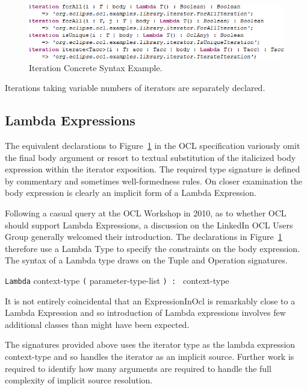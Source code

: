 \documentclass{eceasst}
\begin{document}
\begin{figure}
  \begin{center}
    \includegraphics[width=5.75in]{IterationExample.png}
  \end{center}
  \caption{Iteration Concrete Syntax Example.}
  \label{fig:IterationExample}
\end{figure}

Iterations taking variable numbers of iterators are separately declared.

\subsection{Lambda Expressions}

The equivalent declarations to Figure~\ref{fig:IterationExample} in the OCL specification variously omit the final body argument or resort to textual substitution of the italicized body expression within the iterator exposition. The required type signature is defined by commentary and sometimes well-formedness rules. On closer examination the body expression is clearly an implicit form of a Lambda Expression.

Following a casual query at the OCL Workshop in 2010, as to whether OCL should support Lambda Expressions, a discussion on the LinkedIn OCL Users Group generally welcomed their introduction. The declarations in Figure~\ref{fig:IterationExample} therefore use a Lambda Type to specify the constraints on the body expression. The syntax of a Lambda type draws on the Tuple and Operation signatures.

\verb|Lambda| context-type \verb|(| parameter-type-list \verb|) : | context-type

It is not entirely coincidental that an ExpressionInOcl is remarkably close to a Lambda Expression and so introduction of Lambda expressions involves few additional classes than might have been expected.

The signatures provided above uses the iterator type as the lambda expression context-type and so handles the iterator as an implicit source. Further work is required to identify how many arguments are required to handle the full complexity of implicit source resolution.
\end{document}

